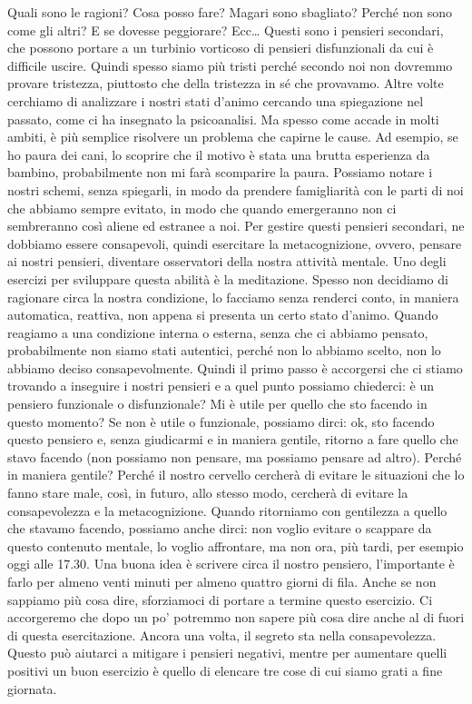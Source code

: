 \documentclass[12pt]{book} %
\begin{document}
Quali sono le ragioni? Cosa posso fare? Magari sono sbagliato? Perché non sono come gli altri? E se dovesse peggiorare?
Ecc… Questi sono i pensieri secondari, che possono portare a un turbinio vorticoso di pensieri disfunzionali da cui è
difficile uscire. Quindi spesso siamo più tristi perché secondo noi non dovremmo provare tristezza, piuttosto che della
tristezza in sé che provavamo. Altre volte cerchiamo di analizzare i nostri stati d'animo cercando
una spiegazione nel passato, come ci ha insegnato la psicoanalisi. Ma spesso come accade in molti ambiti, è più
semplice risolvere un problema che capirne le cause. Ad esempio, se ho paura dei cani, lo scoprire che il motivo è
stata una brutta esperienza da bambino, probabilmente non mi farà scomparire la paura. Possiamo notare i nostri schemi, senza
spiegarli, in modo da prendere famigliarità con le parti di noi che abbiamo sempre evitato, in modo che quando
emergeranno non ci sembreranno così aliene ed estranee a noi. Per gestire questi pensieri secondari, ne dobbiamo essere
consapevoli, quindi esercitare la metacognizione, ovvero, pensare ai nostri pensieri, diventare osservatori della
nostra attività mentale. Uno degli esercizi per sviluppare questa abilità è la meditazione. Spesso non decidiamo di
ragionare circa la nostra condizione, lo facciamo senza renderci conto, in maniera automatica, reattiva, non appena si
presenta un certo stato d'animo. Quando reagiamo a una condizione interna o esterna, senza che ci
abbiamo pensato, probabilmente non siamo stati autentici, perché non lo abbiamo scelto, non lo abbiamo deciso consapevolmente. Quindi il primo passo è
accorgersi che ci stiamo trovando a inseguire i nostri pensieri e a quel punto possiamo chiederci: è un pensiero
funzionale o disfunzionale? Mi è utile per quello che sto facendo in questo momento? Se non è utile o funzionale,
possiamo dirci: ok, sto facendo questo pensiero e, senza giudicarmi e in maniera gentile, ritorno a fare quello che
stavo facendo (non possiamo non pensare, ma possiamo pensare ad altro). 
Perché in maniera gentile? Perché il nostro cervello cercherà di evitare le situazioni che lo fanno
stare male, così, in futuro, allo stesso modo, cercherà di evitare la consapevolezza e la metacognizione. Quando
ritorniamo con gentilezza a quello che stavamo facendo, possiamo anche dirci: non voglio evitare o scappare da questo
contenuto mentale, lo voglio affrontare, ma non ora, più tardi, per esempio oggi alle 17.30. Una buona idea è scrivere
circa il nostro pensiero, l'importante è farlo per almeno venti minuti per almeno quattro giorni
di fila. Anche se non sappiamo più cosa dire, sforziamoci di portare a termine questo esercizio. Ci accorgeremo che
dopo un po' potremmo non sapere più cosa dire anche al di fuori di questa esercitazione. Ancora una volta, il segreto sta
nella consapevolezza. Questo può aiutarci a mitigare i pensieri negativi, mentre per aumentare quelli positivi un buon esercizio è quello di elencare tre cose di cui siamo grati a fine giornata.
\end{document}
